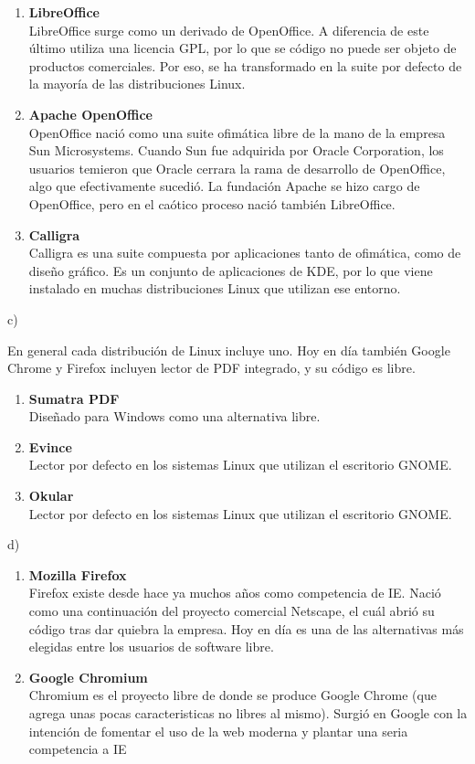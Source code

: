 \begin{enumerate}
    \item \textbf{LibreOffice}\\
        LibreOffice surge como un derivado de OpenOffice. A diferencia de este
        último utiliza una licencia GPL, por lo que se código no puede ser objeto
        de productos comerciales. Por eso, se ha transformado en la suite por
        defecto de la mayoría de las distribuciones Linux.
    \item \textbf{Apache OpenOffice}\\
        OpenOffice nació como una suite ofimática libre de la mano de la empresa
        Sun Microsystems. Cuando Sun fue adquirida por Oracle Corporation, los
        usuarios temieron que Oracle cerrara la rama de desarrollo de OpenOffice,
        algo que efectivamente sucedió. La fundación Apache se hizo cargo de
        OpenOffice, pero en el caótico proceso nació también LibreOffice.
    \item \textbf{Calligra}\\
        Calligra es una suite compuesta por aplicaciones tanto de ofimática,
        como de diseño gráfico. Es un conjunto de aplicaciones de KDE, por lo
        que viene instalado en muchas distribuciones Linux que utilizan ese
        entorno.
\end{enumerate}

\noindent c)

En general cada distribución de Linux incluye uno. Hoy en día también Google
Chrome y Firefox incluyen lector de PDF integrado, y su código es libre.
\begin{enumerate}
    \item \textbf{Sumatra PDF}\\
        Diseñado para Windows como una alternativa libre.
    \item \textbf{Evince}\\
        Lector por defecto en los sistemas Linux que utilizan el escritorio GNOME.
    \item \textbf{Okular}\\
        Lector por defecto en los sistemas Linux que utilizan el escritorio GNOME.
\end{enumerate}

\noindent d)

\begin{enumerate}
    \item \textbf{Mozilla Firefox}\\
        Firefox existe desde hace ya muchos años como competencia de IE.
        Nació como una continuación del proyecto comercial Netscape, el cuál
        abrió su código tras dar quiebra la empresa. Hoy en día es una de las
        alternativas más elegidas entre los usuarios de software libre.
    \item \textbf{Google Chromium}\\
        Chromium es el proyecto libre de donde se produce Google Chrome
        (que agrega unas pocas caracteristicas no libres al mismo). Surgió
        en Google con la intención de fomentar el uso de la web moderna y
        plantar una seria competencia a IE
\end{enumerate}

